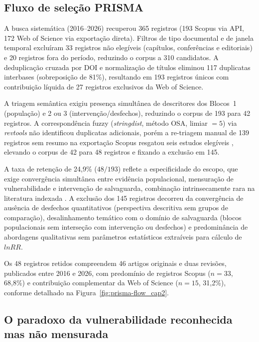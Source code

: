 \subsection{Fluxo de seleção PRISMA}
\label{sec:prisma-flow_cap2}

A busca sistemática (2016--2026) recuperou 365 registros (193 Scopus via API, 172 Web of Science via exportação direta). Filtros de tipo documental e de janela temporal excluíram 33 registros não elegíveis (capítulos, conferências e editoriais) e 20 registros fora do período, reduzindo o corpus a 310 candidatos. A deduplicação cruzada por DOI e normalização de títulos eliminou 117 duplicatas interbases (sobreposição de 81\%), resultando em 193 registros únicos com contribuição líquida de 27 registros exclusivos da Web of Science.

A triagem semântica exigiu presença simultânea de descritores dos Blocos~1 (população) e 2 ou 3 (intervenção/desfechos), reduzindo o corpus de 193 para 42 registros. A correspondência fuzzy (\textit{stringdist}, método OSA, limiar $= 5$) via \textit{revtools} \cite{Westgate2019} não identificou duplicatas adicionais, porém a re-triagem manual de 139 registros sem resumo na exportação Scopus resgatou seis estudos elegíveis \cite{Aswani2020,Bussmann2018,Ghanimi2022,Malapane2024,RodriguezCruz2022,Rodriguez2018}, elevando o corpus de 42 para 48 registros e fixando a exclusão em 145.

A taxa de retenção de 24,9\% ($48/193$) reflete a especificidade do escopo, que exige convergência simultânea entre evidência populacional, mensuração de vulnerabilidade e intervenção de salvaguarda, combinação intrinsecamente rara na literatura indexada \cite{Agrawal2002,GomezBaggethun2013}. A exclusão dos 145 registros decorreu da convergência de ausência de desfechos quantitativos (perspectiva descritiva sem grupos de comparação), desalinhamento temático com o domínio de salvaguarda (blocos populacionais sem interseção com intervenção ou desfechos) e predominância de abordagens qualitativas sem parâmetros estatísticos extraíveis para cálculo de $lnRR$.

Os 48 registros retidos compreendem 46 artigos originais e duas revisões, publicados entre 2016 e 2026, com predomínio de registros Scopus ($n = 33$, 68,8\%) e contribuição complementar da Web of Science ($n = 15$, 31,2\%), conforme detalhado na Figura~\ref{fig:prisma-flow_cap2}.

\subsection{O paradoxo da vulnerabilidade reconhecida mas não mensurada}
\label{sec:thematic-profile_cap2}

